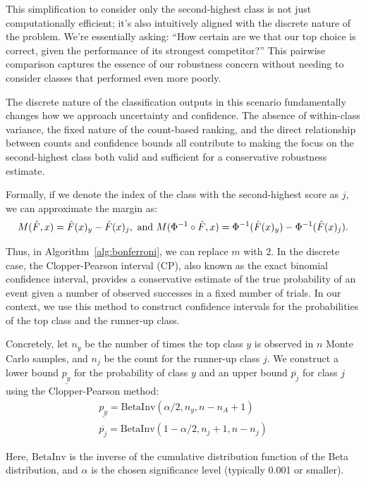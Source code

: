 This simplification to consider only the second-highest class is not just computationally efficient; it's also intuitively aligned with the discrete nature of the problem.
We're essentially asking: ``How certain are we that our top choice is correct, given the performance of its strongest competitor?'' This pairwise comparison captures the essence of our robustness concern without needing to consider classes that performed even more poorly.

The discrete nature of the classification outputs in this scenario fundamentally changes how we approach uncertainty and confidence.
The absence of within-class variance, the fixed nature of the count-based ranking, and the direct relationship between counts and confidence bounds all contribute to making the focus on the second-highest class both valid and sufficient for a conservative robustness estimate.

Formally, if we denote the index of the class with the second-highest score as $j$, we can approximate the margin as:
\begin{align*}
    M(\Hat{F},x) =\Hat{F}(x)_{y} - \Hat{F}(x)_j, \text{ and }M(\Phi^{-1}\circ\Hat{F},x) =\Phi^{-1}(\Hat{F}(x)_{y}) - \Phi^{-1}(\Hat{F}(x)_j).
\end{align*}

Thus, in Algorithm~\ref{alg:bonferroni}, we can replace $m$ with $2$.
In the discrete case, the Clopper-Pearson interval (CP), also known as the exact binomial confidence interval, provides a conservative estimate of the true probability of an event given a number of observed successes in a fixed number of trials.
In our context, we use this method to construct confidence intervals for the probabilities of the top class and the runner-up class.

Concretely, let $n_y$ be the number of times the top class $y$ is observed in $n$ Monte Carlo samples, and $n_j$ be the count for the runner-up class $j$.
We construct a lower bound $\underline{p_y}$ for the probability of class $y$ and an upper bound $\overline{p_j}$ for class $j$ using the Clopper-Pearson method:
\begin{gather*}
    \underline{p_y} = \text{BetaInv}(\alpha/2, n_y, n - n_A + 1)\\
    \overline{p_j} = \text{BetaInv}(1-\alpha/2, n_j + 1, n - n_j)
\end{gather*}

Here, $\text{BetaInv}$ is the inverse of the cumulative distribution function of the Beta distribution, and $\alpha$ is the chosen significance level (typically 0.001 or smaller).


